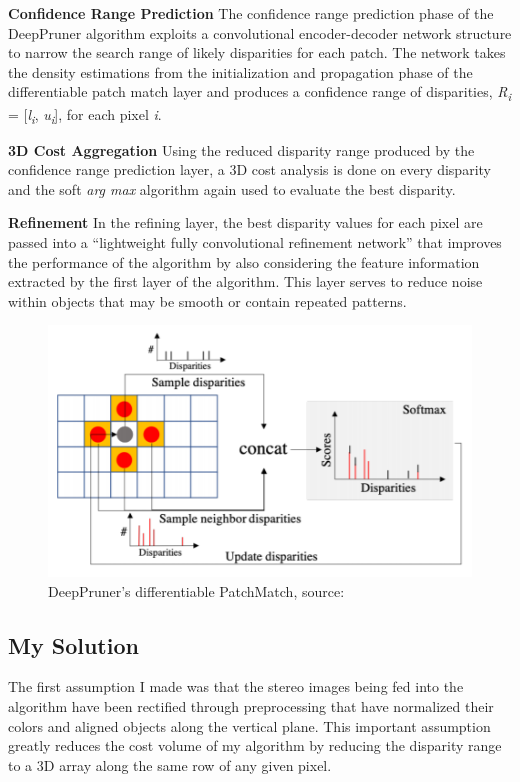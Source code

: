 \documentclass{article}
\begin{document}
\textbf{Confidence Range Prediction} The confidence range prediction phase of the DeepPruner \citep{duggal2019deeppruner} algorithm exploits a convolutional encoder-decoder network structure to narrow the search range of likely disparities for each patch. The network takes the density estimations from the initialization and propagation phase of the differentiable patch match layer and produces a confidence range of disparities, \textit{R\textsubscript{i}} = [\textit{l\textsubscript{i}}, \textit{u\textsubscript{i}}], for each pixel \textit{i}.

\textbf{3D Cost Aggregation} Using the reduced disparity range produced by the confidence range prediction layer, a 3D cost analysis is done on every disparity and the soft \textit{arg max} algorithm again used to evaluate the best disparity.

\textbf{Refinement} In the refining layer, the best disparity values for each pixel are passed into a “lightweight fully convolutional refinement network” \citep{duggal2019deeppruner} that improves the performance of the algorithm by also considering the feature information extracted by the first layer of the algorithm.  This layer serves to reduce noise within objects that may be smooth or contain repeated patterns.
\begin{figure}[ht]
\vskip 0.0in
\begin{center}
\centerline{\includegraphics[width=\columnwidth]{Figure2.png}}
\caption{DeepPruner's differentiable PatchMatch, source: \citep{duggal2019deeppruner}}
\label{figure2}
\end{center}
\vskip -0.2in
\end{figure}

\subsection{My Solution}
\label{mysolution}
The first assumption I made was that the stereo images being fed into the algorithm have been rectified through preprocessing that have normalized their colors and aligned objects along the vertical plane. This important assumption greatly reduces the cost volume of my algorithm by reducing the disparity range to a 3D array along the same row of any given pixel.
\end{document}
